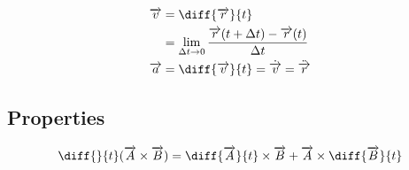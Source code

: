 \documentclass[fleqn]{article}
\begin{document}
\begin{align*}
	\overrightarrow{v} &= \diff{\overrightarrow{r}}{t}\\
	&= \lim\limits_{\Delta t \rightarrow 0} \dfrac{\overrightarrow{r}(t + \Delta t) - \overrightarrow{r}(t)}{\Delta t}\\
	\overrightarrow{a} &= \diff{\overrightarrow{v}}{t} = \dot{\overrightarrow{v}} = \ddot{\overrightarrow{r}}
\end{align*}

\subsection{Properties}

\begin{equation*}
	\diff{}{t} (\overrightarrow{A} \times \overrightarrow{B}) = \diff{\overrightarrow{A}}{t} \times \overrightarrow{B} + \overrightarrow{A} \times \diff{\overrightarrow{B}}{t}
\end{equation*}
\end{document}
